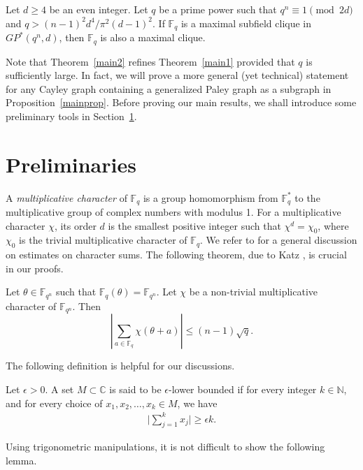 \documentclass[Unicode,ALCO,published]{cedram}
\newcommand{\C}{\mathbb{C}}
\newcommand{\N}{\mathbb{N}}
\newcommand{\F}{\mathbb{F}}
\begin{document}
\begin{thm}\label{main2}
Let $d \geq 4$ be an even integer. Let $q$ be a prime power such that $q^n \equiv 1 \pmod {2d}$ and $q>(n-1)^2d^4/\pi^2(d-1)^2$. If $\F_q$ is a maximal subfield clique in~$GP^*(q^n,d)$, then $\F_q$ is also a maximal clique. 
\end{thm}

Note that Theorem~\ref{main2} refines Theorem~\ref{main1} provided that $q$ is sufficiently large. In fact, we will prove a more general (yet technical) statement for any Cayley graph containing a generalized Paley graph as a subgraph in Proposition~\ref{mainprop}. Before proving our main results, we shall introduce some preliminary tools in Section~\ref{prelim}. 


\section{Preliminaries}\label{prelim}
A {\em multiplicative character} of $\F_q$ is a group homomorphism from $\F_q^*$ to the multiplicative group of complex numbers with modulus 1. For a multiplicative character $\chi$, its order $d$ is the smallest positive integer such that $\chi^d=\chi_0$, where $\chi_0$ is the trivial multiplicative character of $\F_q$. We refer to \cite[Chapter 5]{LN} for a general discussion on estimates on character sums. The following theorem, due to Katz \cite{K89}, is crucial in our proofs.


\begin{thm}[Katz]\label{Katz}
Let $\theta \in \F_{q^n}$ such that $\F_q(\theta)=\F_{q^n}$. Let $\chi$ be a non-trivial multiplicative character of $\mathbb{F}_{q^{n}}.$ Then
$$
\left|\sum_{a \in \mathbb{F}_{q}} \chi(\theta+a)\right| \leq(n-1) \sqrt{q}.
$$
\end{thm}

The following definition is helpful for our discussions.

\begin{defi}[{\cite[Definition 2.16]{AY}}]\label{defn:epsilon-bounded}\rm
Let $\epsilon>0$. A set $M \subset \C$ is said to be $\epsilon$-lower bounded if for every integer $k \in \N$, and for every choice of $x_1,x_2,\ldots, x_k \in M$, we have
\begin{align*}
\bigg|\sum_{j=1}^{k} x_j\bigg| \geq \epsilon k.
\end{align*}
\end{defi}

Using trigonometric manipulations, it is not difficult to show the following lemma. 
\end{document}
